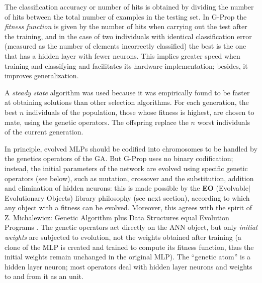 \documentclass{elsart}
\begin{document}
The classification accuracy or number of hits is obtained by dividing the number of hits between the total number of examples in the testing set.
In G-Prop the \emph{fitness function} is given by the number of hits when carrying out the test after the training, and in the case of two individuals with identical classification error (measured as the number of elements incorrectly classified) the best is the one that has a hidden layer with fewer neurons. This implies greater speed when training and classifying and facilitates its hardware implementation; besides, it improves generalization. 

A \emph{steady state} \cite{Whitley} algorithm was used because it was empirically found to be faster at obtaining solutions than other selection algorithms. For each generation, the best $n$ individuals of the population, those whose fitness is highest, are chosen to mate, using the genetic operators. The offspring replace the $n$ worst individuals of the current generation.


In principle, evolved MLPs should be codified into chromosomes to be handled by the genetics operators of the GA. But G-Prop uses no binary codification; instead, the initial parameters of the network are evolved using specific genetic operators (see below), such as mutation, crossover and the substitution, addition and elimination of hidden neurons: this is made possible by the \textbf{EO} (Evolvable$|$Evolutionary Objects) library philosophy (see next section), according to which any object with a fitness can be evolved. Moreover, this agrees with the spirit of Z. Michalewicz: Genetic Algorithm plus Data Structures equal Evolution Programs \cite{Michalewicz} . The genetic operators act directly on the ANN object, but only \emph{initial weights} are subjected to evolution, not the weights obtained after training (a clone of the MLP is created and trained to compute its fitness function, thus the initial weights remain unchanged in the original MLP). The ``genetic atom'' is a hidden layer neuron; most operators deal with hidden layer neurons and weights to and from it as an unit.
\end{document}
